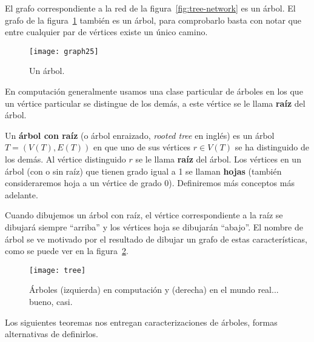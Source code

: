 \begin{ejemplo}
El grafo correspondiente a la red de la figura~\ref{fig:tree-network} es un árbol.
El grafo de la figura~\ref{fig:graph25} también es un árbol, para comprobarlo basta con notar que entre cualquier par de vértices existe un único camino.
\begin{figure}[h!]
\centering
\texttt{[image: graph25]}
\caption{Un árbol.}
\label{fig:graph25}
\end{figure}
\end{ejemplo}

En computación generalmente usamos una clase particular de árboles en los que un vértice particular se distingue de los demás, a este vértice se le llama {\bf raíz} del árbol.

\begin{definicion}
Un {\bf árbol con raíz} (o árbol enraizado, \emph{rooted tree} en inglés) es un árbol $T=(V(T),E(T))$ en que uno de sus vértices $r\in V(T)$ se ha distinguido de los demás. 
Al vértice distinguido $r$ se le llama {\bf raíz} del árbol.
Los vértices en un árbol (con o sin raíz) que tienen grado igual a 1 se llaman {\bf hojas}
(también consideraremos hoja a un vértice de grado 0).
Definiremos más conceptos más adelante.
\end{definicion}
Cuando dibujemos un árbol con raíz, el vértice correspondiente a la raíz se dibujará siempre ``arriba'' y los vértices hoja se dibujarán ``abajo''.
El nombre de árbol se ve motivado por el resultado de dibujar un grafo de estas características, como se puede ver en la figura~\ref{fig:tree}.
\begin{figure}[h!]
\centering
\texttt{[image: tree]}
\caption{Árboles (izquierda) en computación y (derecha) en el mundo real... bueno, casi.}
\label{fig:tree}
\end{figure}

Los siguientes teoremas nos entregan caracterizaciones de árboles, formas alternativas de definirlos.

